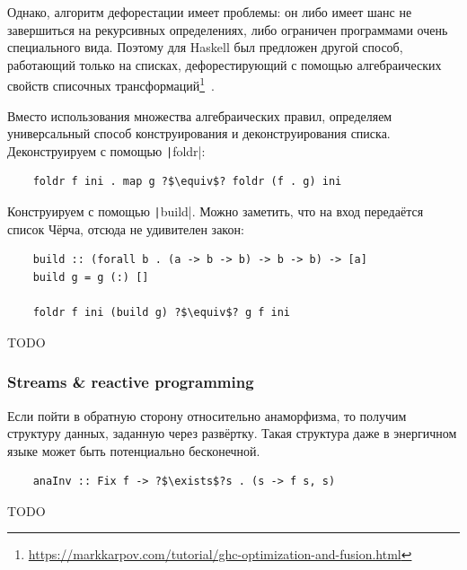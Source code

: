 Однако, алгоритм дефорестации имеет проблемы: он либо имеет шанс не завершиться на рекурсивных определениях, либо ограничен программами очень специального вида.
Поэтому для Haskell был предложен другой способ, работающий только на списках, дефорестирующий с помощью алгебраических свойств списочных трансформаций\footnote{\url{https://markkarpov.com/tutorial/ghc-optimization-and-fusion.html}}~\cite{gill1993short}.

Вместо использования множества алгебраических правил, определяем универсальный способ конструирования и деконструирования списка.
Деконструируем с помощью \texttt|foldr|:
\begin{verbatim}
    foldr f ini . map g ?$\equiv$? foldr (f . g) ini
\end{verbatim}

Конструируем с помощью \texttt|build|.
Можно заметить, что на вход передаётся список Чёрча, отсюда не удивителен закон:
\begin{verbatim}
    build :: (forall b . (a -> b -> b) -> b -> b) -> [a]
    build g = g (:) []

    foldr f ini (build g) ?$\equiv$? g f ini
\end{verbatim}


TODO %

\subsubsection{Streams \& reactive programming}

Если пойти в обратную сторону относительно анаморфизма, то получим структуру данных, заданную через развёртку.
Такая структура даже в энергичном языке может быть потенциально бесконечной.
\begin{verbatim}
    anaInv :: Fix f -> ?$\exists$?s . (s -> f s, s)
\end{verbatim}

TODO\cite{coutts2007stream, kiselyov2022highest} %






